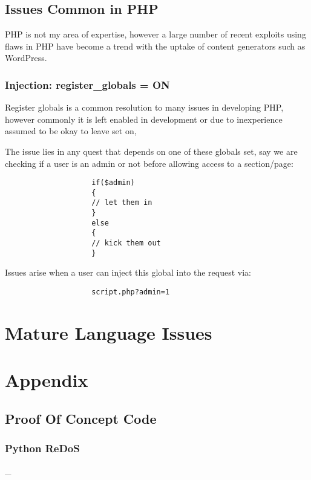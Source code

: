 \documentclass{IEEEtran}
\newcommand\pythonstyle{
        \lstset{style=python}
    }
\newcommand\pythonexternal[2][]{{
        \pythonstyle
        }}
\begin{document}
        \subsection{Issues Common in PHP}
            PHP is not my area of expertise, however a large number of recent exploits using 
            flaws in PHP have become a trend with the uptake of content generators such as WordPress.
            \subsubsection{Injection: register\_globals = ON}
                Register globals is a common resolution to many issues in developing PHP, however
                commonly it is left enabled in development or due to inexperience assumed to be okay to 
                leave set on,
                
                \newpage

                The issue lies in any quest that depends on one of these globals set, say we are 
                checking if a user is an admin or not before allowing access to a section/page:

                \lstset{style=php}
                \begin{lstlisting}
                    if($admin) 
                    { 
                    // let them in 
                    } 
                    else 
                    { 
                    // kick them out 
                    }
                \end{lstlisting}\cite{Devshed-PHP}

                Issues arise when a user can inject this global into the request via:

                \begin{lstlisting}
                    script.php?admin=1
                \end{lstlisting}


    \newpage
    \section{Mature Language Issues}

    \newpage
    \printbibliography

    \newpage
    \onecolumn
    \appendix
    \section{Appendix}
        \subsection{Proof Of Concept Code}
            \subsubsection{Python ReDoS}
            \label{sec:PyReDoS}
            \_
            \medskip
                \pythonexternal{Resources/regex.py}

    
\end{document}
